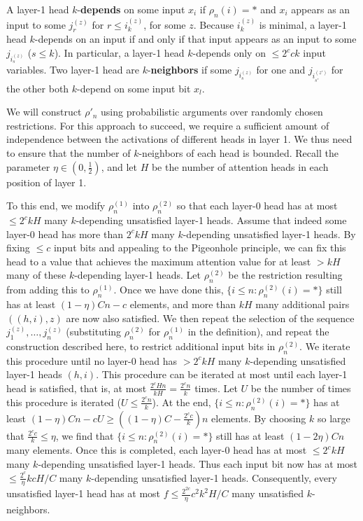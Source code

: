 \documentclass[11pt,a4paper]{article}
\begin{document}
A layer-1 head $k$-\textbf{depends} on some input $x_i$ if $\rho_n(i) = *$ and $x_i$ appears as an input to some $j_r^{(z)}$ for $r \leq i_k^{(z)}$, for some $z$.
Because $i_k^{(z)}$ is minimal, a layer-1 head $k$-depends on an input if and only if that input appears as an input to some $j_{i_s^{(z)}}$ ($s \leq k$).
In particular, a layer-1 head $k$-depends only on $\leq 2^c ck$ input variables.
Two layer-1 head are $k$-\textbf{neighbors} if some $j_{i_s^{(z)}}$ for one and $j_{i_{s'}^{(z')}}$ for the other both $k$-depend on some input bit $x_l$.

We will construct $\rho'_n$ using probabilistic arguments over randomly chosen restrictions.
For this approach to succeed, we require a  sufficient amount of independence between the activations of different heads in layer 1.
We thus need to ensure that the number of $k$-neighbors of each head is bounded.
Recall the parameter $\eta \in (0,\frac{1}{2})$, and let $H$ be the number of attention heads in each position of layer 1.



To this end, we modify $\rho^{(1)}_n$ into $\rho^{(2)}_n$ so that each layer-0 head has at most $\leq 2^c kH$ many $k$-depending unsatisfied layer-1 heads.
Assume that indeed some layer-0 head  has more than $2^c kH$ many $k$-depending unsatisfied layer-1 heads. %
By fixing $\leq c$ input bits and appealing to the Pigeonhole principle, we can fix this head to a value that achieves the maximum attention value for at least $> kH$ many of these $k$-depending layer-1 heads.
Let $\rho^{(2)}_n$ be the restriction resulting from adding this to $\rho^{(1)}_n$.
Once we have done this, 
$\{i \leq n: \rho_n^{(2)}(i) = *\}$ still has at least $(1-\eta) C n - c$ elements, and more than $kH$ many additional pairs $((h,i),z)$ are now also satisfied.
We then repeat the selection of the sequence $j_1^{(z)}, \dots, j_n^{(z)}$ (substituting $\rho^{(2)}_n$ for $\rho^{(1)}_n$ in the definition), and repeat the construction described here, to restrict additional input bits in $\rho^{(2)}_n$.
We iterate this procedure until no layer-0 head has $>  2^c kH$ many $k$-depending unsatisfied layer-1 heads $(h,i)$. %
This procedure can be iterated at most until each layer-1 head is satisfied, that is, at most $\frac{2^c H n}{kH} = \frac{2^c n}{k}$ times.
Let $U$ be the number of times this procedure is iterated ($U \leq \frac{2^c n}{k}$).
At the end, $\{i \leq n: \rho_n^{(2)}(i) = *\}$ has at least $(1-\eta) C n - cU \geq \left((1-\eta) C  - \frac{2^c c}{k}\right) n$ elements.
By choosing $k$ so large that $\frac{2^c c}{k} \leq \eta$, we find that $\{i \leq n: \rho^{(2)}_n(i) = *\}$  still has at least $(1-2\eta) C n$ many elements.
Once this is completed, each layer-0 head has at most $\leq 2^c kH$ many $k$-depending unsatisfied layer-1 heads.
Thus each input bit now has at most $\leq \frac{2^c}{\eta}kcH/C$ many $k$-depending unsatisfied layer-1 heads.
Consequently, every unsatisfied layer-1 head has at most $f \leq \frac{2^{2c}}{\eta}c^2k^2H/C$ many unsatisfied $k$-neighbors.
\end{document}
